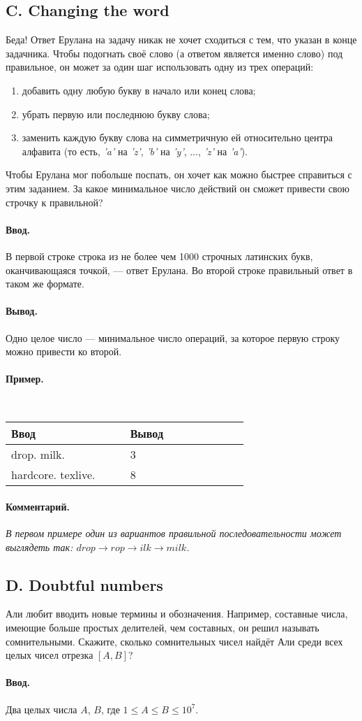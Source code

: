 \documentclass[12pt, a4paper]{article}
\newcommand{\informat}[1]
{
	\paragraph{Ввод.\\} #1
}
\newcommand{\outformat}[1]
{
	\paragraph{Вывод.\\} #1
}
\newcommand{\examplee}[4]
{
	\paragraph{Пример.\\}
	{\tt
	\begin{tabular}{|p{0.4\linewidth}|p{0.4\linewidth}|}
	\hline
	Ввод 	& Вывод  	\\
	\hline
	#1 		& #2 		\\
	\hline
	#3		& #4		\\
	\hline
	\end{tabular}
	}
}
\newcommand{\excomm}[1]
{
	\paragraph{Комментарий. \\}
	\textit{#1}
}
\begin{document}
\subsection*{C. Changing the word}

Беда! Ответ Ерулана на задачу никак не хочет сходиться с тем, что указан в конце задачника. Чтобы подогнать своё слово (а ответом является именно слово) под правильное, он может за один шаг использовать одну из трех операций:
\begin{enumerate}
\item добавить одну любую букву в начало или конец слова;
\item убрать первую или последнюю букву слова;
\item заменить каждую букву слова на симметричную ей относительно центра алфавита (то есть, \textit{'a'} на \textit{'z'}, \textit{'b'} на \textit{'y'}, $\dots$, \textit{'z'} на \textit{'a'}).
\end{enumerate}
Чтобы Ерулана мог побольше поспать, он хочет как можно быстрее справиться с этим заданием. За какое минимальное число действий он сможет привести свою строчку к правильной?

\informat{В первой строке строка из не более чем 1000 строчных латинских букв, оканчивающаяся точкой, --- ответ Ерулана. \newline 
Во второй строке правильный ответ в таком же формате.}

\outformat{Одно целое число --- минимальное число операций, за которое первую строку можно привести ко второй.}

\examplee{drop. \newline milk.}{3}{hardcore. \newline texlive.}{8}

\excomm{В первом примере один из вариантов правильной последовательности может выглядеть так: $drop \rightarrow rop \rightarrow ilk \rightarrow milk$.}



\subsection*{D. Doubtful numbers}

Али любит вводить новые термины и обозначения. Например, составные числа, имеющие больше простых делителей, чем составных, он решил называть сомнительными. Скажите, сколько сомнительных чисел найдёт Али среди всех целых чисел отрезка $[A, B]$?

\informat{Два целых числа $A$, $B$, где $1 \le A \le B \le 10^7$.}
\end{document}
